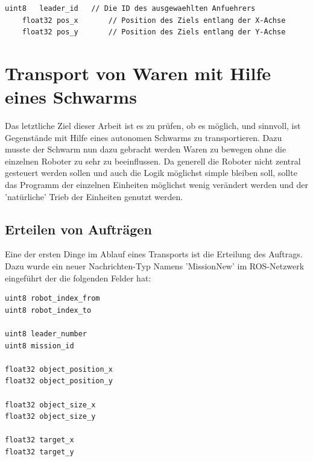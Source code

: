 \begin{lstlisting}[style=ros, title=Nachrichten-Typ: New\_Mission]
	uint8	leader_id	// Die ID des ausgewaehlten Anfuehrers
	float32 pos_x		// Position des Ziels entlang der X-Achse
	float32 pos_y		// Position des Ziels entlang der Y-Achse
\end{lstlisting}





\section{Transport von Waren mit Hilfe eines Schwarms}

Das letztliche Ziel dieser Arbeit ist es zu prüfen, ob es möglich, und sinnvoll, ist Gegenstände mit Hilfe eines autonomen Schwarms zu transportieren. Dazu musste der Schwarm nun dazu gebracht werden Waren zu bewegen ohne die einzelnen Roboter zu sehr zu beeinflussen. Da generell die Roboter nicht zentral gesteuert werden sollen und auch die Logik möglichst simple bleiben soll, sollte das Programm der einzelnen Einheiten möglichst wenig verändert werden und der 'natürliche' Trieb der Einheiten genutzt werden.

\subsection*{Erteilen von Aufträgen}

Eine der ersten Dinge im Ablauf eines Transports ist die Erteilung des Auftrags. Dazu wurde ein neuer Nachrichten-Typ Namens 'MissionNew' im ROS-Netzwerk eingeführt der die folgenden Felder hat:

\begin{lstlisting}[frame=L]
uint8 robot_index_from
uint8 robot_index_to

uint8 leader_number
uint8 mission_id

float32 object_position_x
float32 object_position_y

float32 object_size_x
float32 object_size_y

float32 target_x
float32 target_y
\end{lstlisting}

